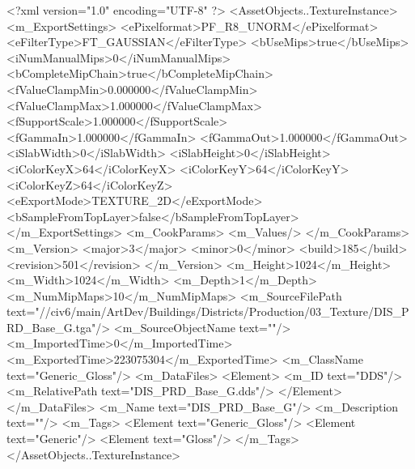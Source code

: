 <?xml version="1.0" encoding="UTF-8" ?>
<AssetObjects..TextureInstance>
	<m_ExportSettings>
		<ePixelformat>PF_R8_UNORM</ePixelformat>
		<eFilterType>FT_GAUSSIAN</eFilterType>
		<bUseMips>true</bUseMips>
		<iNumManualMips>0</iNumManualMips>
		<bCompleteMipChain>true</bCompleteMipChain>
		<fValueClampMin>0.000000</fValueClampMin>
		<fValueClampMax>1.000000</fValueClampMax>
		<fSupportScale>1.000000</fSupportScale>
		<fGammaIn>1.000000</fGammaIn>
		<fGammaOut>1.000000</fGammaOut>
		<iSlabWidth>0</iSlabWidth>
		<iSlabHeight>0</iSlabHeight>
		<iColorKeyX>64</iColorKeyX>
		<iColorKeyY>64</iColorKeyY>
		<iColorKeyZ>64</iColorKeyZ>
		<eExportMode>TEXTURE_2D</eExportMode>
		<bSampleFromTopLayer>false</bSampleFromTopLayer>
	</m_ExportSettings>
	<m_CookParams>
		<m_Values/>
	</m_CookParams>
	<m_Version>
		<major>3</major>
		<minor>0</minor>
		<build>185</build>
		<revision>501</revision>
	</m_Version>
	<m_Height>1024</m_Height>
	<m_Width>1024</m_Width>
	<m_Depth>1</m_Depth>
	<m_NumMipMaps>10</m_NumMipMaps>
	<m_SourceFilePath text="//civ6/main/ArtDev/Buildings/Districts/Production/03_Texture/DIS_PRD_Base_G.tga"/>
	<m_SourceObjectName text=""/>
	<m_ImportedTime>0</m_ImportedTime>
	<m_ExportedTime>223075304</m_ExportedTime>
	<m_ClassName text="Generic_Gloss"/>
	<m_DataFiles>
		<Element>
			<m_ID text="DDS"/>
			<m_RelativePath text="DIS_PRD_Base_G.dds"/>
		</Element>
	</m_DataFiles>
	<m_Name text="DIS_PRD_Base_G"/>
	<m_Description text=""/>
	<m_Tags>
		<Element text="Generic_Gloss"/>
		<Element text="Generic"/>
		<Element text="Gloss"/>
	</m_Tags>
</AssetObjects..TextureInstance>

